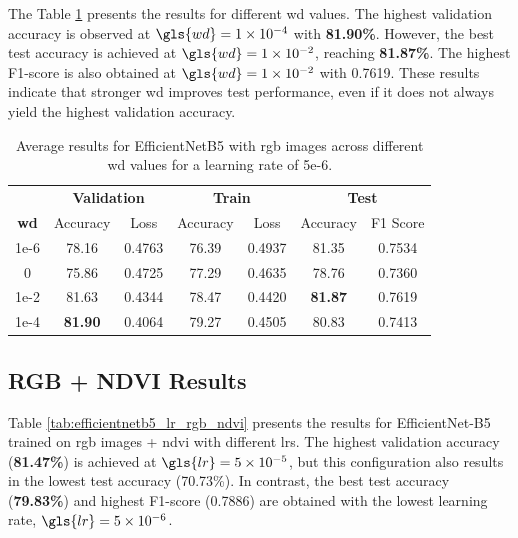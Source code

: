The Table \ref{tab:efficientnetb5_wd_rgb} presents the results for different 
\gls{wd} values. The highest validation accuracy is observed at 
$\gls{wd}=1\times10^{-4}$ with \textbf{81.90\%}. However, the best test accuracy is 
achieved at $\gls{wd}=1\times10^{-2}$, reaching \textbf{81.87\%}. The highest F1-score 
is also obtained at $\gls{wd}=1\times10^{-2}$ with 0.7619. These results indicate 
that stronger \gls{wd} improves test performance, even if it does not 
always yield the highest validation accuracy.

\begin{table}[h]
    \centering
    \renewcommand{\arraystretch}{1.3}
    \setlength{\tabcolsep}{8pt}
    \begin{tabular}{|c|cccccc|}
        \hline
        & \multicolumn{2}{c}{\textbf{Validation}} & \multicolumn{2}{c}{\textbf{Train}} & \multicolumn{2}{c|}{\textbf{Test}} \\
        \textbf{\gls{wd}} & Accuracy & Loss & Accuracy & Loss & Accuracy & F1 Score \\
        \hline
        1e-6  & 78.16           & 0.4763 & 76.39  & 0.4937  & 81.35  & 0.7534 \\
        0     & 75.86           & 0.4725 & 77.29  & 0.4635 & 78.76 & 0.7360 \\
        1e-2  & 81.63           & 0.4344 & 78.47  & 0.4420  & \textbf{81.87}  & 0.7619 \\
        1e-4  & \textbf{81.90}  & 0.4064 & 79.27  & 0.4505  & 80.83 & 0.7413 \\
        \hline
    \end{tabular}
    \caption{Average results for EfficientNetB5 with \gls{rgb} images across different \gls{wd} values for a learning rate of 5e-6.}
    \label{tab:efficientnetb5_wd_rgb}
\end{table}



\subsection{RGB + NDVI Results}

Table \ref{tab:efficientnetb5_lr_rgb_ndvi} presents the results for EfficientNet-B5 trained on 
\gls{rgb} images + \gls{ndvi} with different \glspl{lr}. The highest validation accuracy (\textbf{81.47\%}) is 
achieved at $\gls{lr}=5\times10^{-5}$, but this configuration also results in the lowest test 
accuracy (70.73\%). In contrast, the best test accuracy (\textbf{79.83\%}) and highest F1-score 
(0.7886) are obtained with the lowest learning rate, $\gls{lr}=5\times10^{-6}$.

